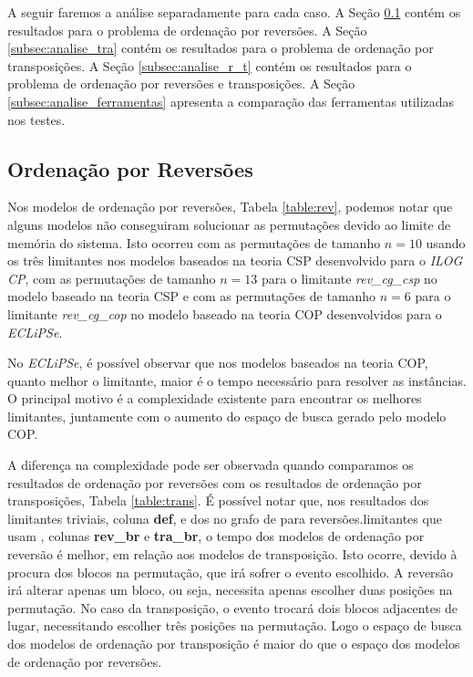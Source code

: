 A seguir faremos a análise separadamente para cada caso. A
Seção \ref{subsec:analise_rev} contém os resultados para o problema de
ordenação por reversões. A Seção \ref{subsec:analise_tra} contém os
resultados para o problema de ordenação por transposições. A
Seção \ref{subsec:analise_r_t} contém os resultados para o problema de
ordenação por reversões e transposições. A
Seção \ref{subsec:analise_ferramentas} apresenta a comparação das
ferramentas utilizadas nos testes.

\subsection{Ordenação por Reversões}
\label{subsec:analise_rev}
Nos modelos de ordenação por reversões, Tabela \ref{table:rev},
podemos notar que alguns modelos não conseguiram solucionar as
permutações devido ao limite de memória do sistema. Isto ocorreu com
as permutações de tamanho $n = 10$ usando os três limitantes nos
modelos baseados na teoria CSP desenvolvido para o \textit{ILOG CP},
com as permutações de tamanho $n = 13$ para o
limitante \textit{rev\_cg\_csp} no modelo baseado na teoria CSP e com
as permutações de tamanho $n = 6$ para o
limitante \textit{rev\_cg\_cop} no modelo baseado na teoria COP
desenvolvidos para o \textit{ECLiPSe}.

No \textit{ECLiPSe}, é possível observar que nos modelos baseados na
teoria COP, quanto melhor o limitante, maior é o tempo necessário para
resolver as instâncias. O principal motivo é a complexidade existente
para encontrar os melhores limitantes, juntamente com o aumento do
espaço de busca gerado pelo modelo COP. 

A diferença na complexidade pode ser observada quando comparamos os
resultados de ordenação por reversões com os resultados de ordenação
por transposições, Tabela \ref{table:trans}. É possível notar que, nos
resultados dos limitantes triviais, coluna \textbf{def}, e dos no
grafo de \bkp{} para reversões.limitantes que usam \bkp{},
colunas \textbf{rev\_br} e \textbf{tra\_br}, o tempo dos modelos de
ordenação por reversão é melhor, em relação aos modelos de
transposição. Isto ocorre, devido à procura dos blocos na permutação,
que irá sofrer o evento escolhido. A reversão irá alterar apenas um
bloco, ou seja, necessita apenas escolher duas posições na
permutação. No caso da transposição, o evento trocará dois blocos
adjacentes de lugar, necessitando escolher três posições na
permutação. Logo o espaço de busca dos modelos de ordenação por
transposição é maior do que o espaço dos modelos de ordenação por
reversões.

